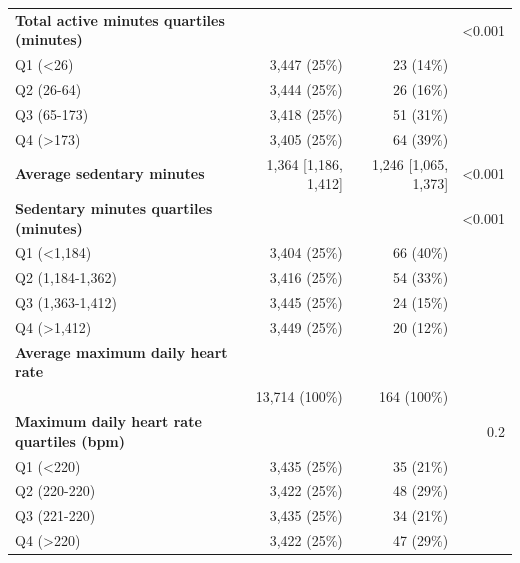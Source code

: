 \documentclass[11pt]{article}
\begin{document}
\begin{longtable}{@{}p{6.4cm}rrr@{}}
\textbf{Total active minutes quartiles (minutes)} &  &  & <0.001 \\
\quad Q1 (<26) & 3,447 (25\%) & 23 (14\%) &  \\
\quad Q2 (26-64) & 3,444 (25\%) & 26 (16\%) &  \\
\quad Q3 (65-173) & 3,418 (25\%) & 51 (31\%) &  \\
\quad Q4 (>173) & 3,405 (25\%) & 64 (39\%) &  \\
\textbf{Average sedentary minutes} & 1,364 [1,186, 1,412] & 1,246 [1,065, 1,373] & <0.001 \\
\textbf{Sedentary minutes quartiles (minutes)} &  &  & <0.001 \\
\quad Q1 (<1,184) & 3,404 (25\%) & 66 (40\%) &  \\
\quad Q2 (1,184-1,362) & 3,416 (25\%) & 54 (33\%) &  \\
\quad Q3 (1,363-1,412) & 3,445 (25\%) & 24 (15\%) &  \\
\quad Q4 (>1,412) & 3,449 (25\%) & 20 (12\%) &  \\
\textbf{Average maximum daily heart rate} &  &  &  \\
\quad 220 & 13,714 (100\%) & 164 (100\%) &  \\
\textbf{Maximum daily heart rate quartiles (bpm)} &  &  & 0.2 \\
\quad Q1 (<220) & 3,435 (25\%) & 35 (21\%) &  \\
\quad Q2 (220-220) & 3,422 (25\%) & 48 (29\%) &  \\
\quad Q3 (221-220) & 3,435 (25\%) & 34 (21\%) &  \\
\quad Q4 (>220) & 3,422 (25\%) & 47 (29\%) &  \\
\bottomrule \end{longtable}\normalsize
\end{document}
